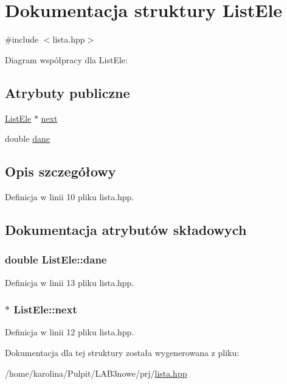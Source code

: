 \hypertarget{struct_list_ele}{\section{Dokumentacja struktury List\-Ele}
\label{struct_list_ele}
}


{\ttfamily \#include $<$lista.\-hpp$>$}



Diagram współpracy dla List\-Ele\-:
\subsection*{Atrybuty publiczne}
\begin{DoxyCompactItemize}
\item 
\hyperlink{struct_list_ele}{List\-Ele} $\ast$ \hyperlink{struct_list_ele_a94ce43c22a26ca3da57cdd34cd9005ad}{next}
\item 
double \hyperlink{struct_list_ele_a52bbe3635f6c0d0b095d12b97c0ee55c}{dane}
\end{DoxyCompactItemize}


\subsection{Opis szczegółowy}


Definicja w linii 10 pliku lista.\-hpp.



\subsection{Dokumentacja atrybutów składowych}
\hypertarget{struct_list_ele_a52bbe3635f6c0d0b095d12b97c0ee55c}{
\subsubsection[{dane}]{\setlength{\rightskip}{0pt plus 5cm}double List\-Ele\-::dane}}\label{struct_list_ele_a52bbe3635f6c0d0b095d12b97c0ee55c}


Definicja w linii 13 pliku lista.\-hpp.

\hypertarget{struct_list_ele_a94ce43c22a26ca3da57cdd34cd9005ad}{
\subsubsection[{next}]{$\ast$ List\-Ele\-::next}}\label{struct_list_ele_a94ce43c22a26ca3da57cdd34cd9005ad}


Definicja w linii 12 pliku lista.\-hpp.



Dokumentacja dla tej struktury została wygenerowana z pliku\-:\begin{DoxyCompactItemize}
\item 
/home/karolina/\-Pulpit/\-L\-A\-B3nowe/prj/\hyperlink{lista_8hpp}{lista.\-hpp}\end{DoxyCompactItemize}
